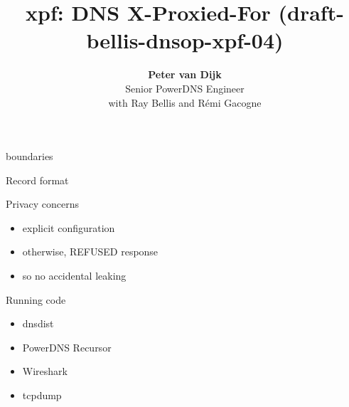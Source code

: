 \documentclass{beamer}
\title[aname]{xpf: DNS X-Proxied-For (draft-bellis-dnsop-xpf-04)}
\author{\textbf{Peter van Dijk}\\Senior PowerDNS Engineer\\with Ray Bellis and Rémi Gacogne}
\date{}
\begin{document}
\begin{frame}
  \titlepage
\end{frame}

\begin{frame}{boundaries}
\end{frame}

\begin{frame}{Record format}
\end{frame}

\begin{frame}{Privacy concerns}
  \begin{itemize}
    \item explicit configuration
    \item otherwise, REFUSED response
    \item so no accidental leaking
  \end{itemize}
\end{frame}

\begin{frame}{Running code}
  \begin{itemize}
    \item dnsdist
    \item PowerDNS Recursor
    \item Wireshark
    \item tcpdump
  \end{itemize}
\end{frame}
\end{document}
